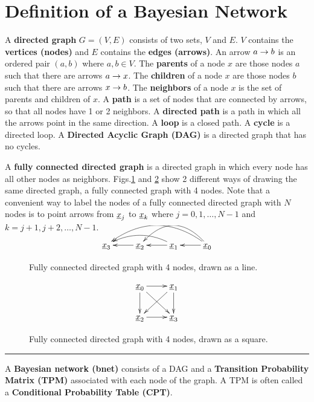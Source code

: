\section{Definition of a Bayesian Network}
\label{ch-bnet-def}

A {\bf directed graph} $G=(V,E)$
consists of two sets, $V$
and $E$. $V$ contains
the {\bf vertices (nodes)}
and $E$ contains the {\bf edges (arrows)}.
An arrow $a\rightarrow b$ is an
ordered pair 
$(a,b)$ where $a, b\in V$.
The {\bf parents} 
of a node $x$ are 
those nodes $a$
such that there are arrows 
$a\rightarrow x$.
The {\bf children} of a node
$x$
are those nodes $b$
such that there are arrows $x\rightarrow b$.
The {\bf neighbors}
of a node $x$
is the set of parents and 
children of $x$.
A {\bf path} is a 
set of nodes that 
are connected 
by arrows, so 
that all nodes
have 1 or 2 neighbors.
A {\bf directed path}
is a path in
which all the arrows point
in the same direction.
A {\bf loop}
is a closed path.
A {\bf cycle} is a directed loop.
A {\bf Directed Acyclic Graph (DAG)}
is a directed graph that has no
cycles. 


A {\bf fully connected directed graph}
is 
a directed graph
in which 
every node has all other 
nodes as neighbors.
Figs.\ref{fig-full-conn-4-line}
and
\ref{fig-full-conn-4-square}
show 2 different
ways of drawing
the same directed graph,
a fully connected graph with 4 nodes.
Note that a convenient
way
to label
the nodes of a fully
connected directed
graph
with $N$ nodes
is to point
arrows
from 
${\underline{x}}_j$ to ${\underline{x}}_k$
where $j=0, 1, \ldots, N-1$
and 
$k=j+1, j+2, \ldots, N-1$.


\begin{figure}[h!]
$$
\xymatrix{
\rvx_3
&\rvx_2\ar[l]
&\rvx_1\ar[l]\ar@/_1pc/[ll]
&\rvx_0\ar[l]\ar@/_2pc/[ll]\ar@/_2pc/[lll]
}
$$
\caption{Fully 
connected directed  graph with 4 nodes,
drawn as a line.}
\label{fig-full-conn-4-line}
\end{figure}

\begin{figure}[h!]
$$
\xymatrix{
\rvx_0\ar[r]\ar[d]\ar[rd]&\rvx_1\ar[d]\ar[ld]
\\
\rvx_2\ar[r]&\rvx_3
}
$$
\caption{Fully 
connected directed  graph with 4 nodes,
drawn as a square.}
\label{fig-full-conn-4-square}
\end{figure}

\hrule

A {\bf Bayesian network (bnet)}
consists of a DAG 
and a 
{\bf Transition 
Probability Matrix (TPM)}
associated 
with each node
of the graph.
A TPM is often 
called a {\bf Conditional Probability
Table 
(CPT)}.

